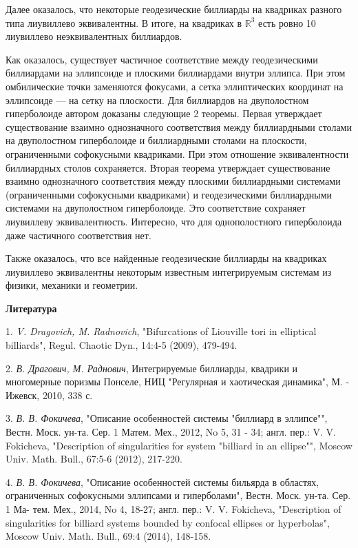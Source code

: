 Далее оказалось, что  некоторые геодезические биллиарды на квадриках разного типа лиувиллево эквивалентны.
В итоге, на квадриках в $\mathbb{R}^3$ есть ровно 10 лиувиллево неэквивалентных биллиардов.



Как оказалось, существует частичное соответствие между геодезическими биллиардами на эллипсоиде и плоскими биллиардами
внутри эллипса. При этом омбилические точки заменяются фокусами, а сетка эллиптических координат на
эллипсоиде  --- на сетку на плоскости. Для биллиардов на двуполостном гиперболоиде
автором  доказаны следующие 2 теоремы. Первая утверждает существование взаимно однозначного соответствия между
биллиардными столами на двуполостном гиперболоиде и биллиардными столами на плоскости, ограниченными софокусными квадриками. При этом
отношение эквивалентности биллиардных столов сохраняется. Вторая теорема утверждает существование
взаимно однозначного соответствия между плоскими биллиардными системами (ограниченными софокусными квадриками) и геодезическими биллиардными
системами на
двуполостном гиперболоиде. Это соответствие сохраняет лиувиллеву эквивалентность.
Интересно, что для однополостного гиперболоида даже частичного соответствия нет.

Также оказалось, что все найденные геодезические биллиарды на квадриках лиувиллево эквивалентны некоторым известным
интегрируемым системам из физики, механики и геометрии.


\smallskip \centerline {\bf Литература} \nopagebreak


1. {\it V. Dragovich, M. Radnovich}, "Bifurcations of Liouville tori in elliptical billiards", Regul.
Chaotic Dyn., 14:4-5 (2009), 479-494.

2. {\it В. Драгович, М. Раднович}, Интегрируемые биллиарды, квадрики и многомерные
поризмы Понселе, НИЦ "Регулярная и хаотическая динамика", М. - Ижевск, 2010,
338 с.

3. {\it В. В. Фокичева}, "Описание особенностей системы "биллиард в эллипсе"", Вестн.
Моск. ун-та. Сер. 1 Матем. Мех., 2012, No 5, 31 - 34; англ. пер.: V. V. Fokicheva,
"Description of singularities for system "billiard in an ellipse"", Moscow Univ. Math.
Bull., 67:5-6 (2012), 217-220.

4. {\it В. В. Фокичева}, "Описание особенностей системы бильярда в областях, ограниченных
софокусными эллипсами и гиперболами", Вестн. Моск. ун-та. Сер. 1 Ма-
тем. Мех., 2014, No 4, 18-27; англ. пер.: V. V. Fokicheva, "Description of singularities
for billiard systems bounded by confocal ellipses or hyperbolas", Moscow Univ. Math.
Bull., 69:4 (2014), 148-158.

